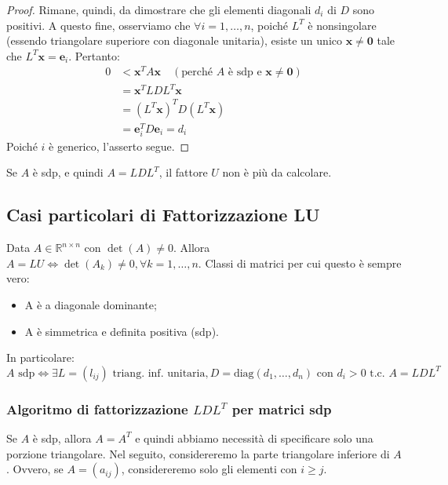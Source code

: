 \begin{proof}
Rimane, quindi, da dimostrare che gli elementi diagonali $d_i$ di $D$ sono positivi.
A questo fine, osserviamo che $\forall i=1, \dots, n$, poiché $L^T$ è nonsingolare (essendo triangolare superiore con diagonale unitaria), esiste un unico $\mathbf{x} \neq \mathbf{0}$ tale che $L^T \mathbf{x} = \mathbf{e}_i$.
Pertanto:
\begin{align*}
    0 &< \mathbf{x}^T A \mathbf{x} \quad (\text{perché } A \text{ è sdp e } \mathbf{x} \neq \mathbf{0}) \\
      &= \mathbf{x}^T L D L^T \mathbf{x} \\
      &= (L^T \mathbf{x})^T D (L^T \mathbf{x}) \\
      &= \mathbf{e}_i^T D \mathbf{e}_i = d_i
\end{align*}
Poiché $i$ è generico, l'asserto segue.
\end{proof}

\begin{osservazione}
Se $A$ è sdp, e quindi $A=LDL^T$, il fattore $U$ non è più da calcolare.
\end{osservazione}


\subsection{Casi particolari di Fattorizzazione LU}
Data $A \in \mathbb{R}^{n \times n}$ con $\det(A) \neq 0$.
Allora $A=LU \iff \det(A_k) \neq 0, \forall k=1, \dots, n$.
Classi di matrici per cui questo è sempre vero:
\begin{itemize}
    \item A è a diagonale dominante;
    \item A è simmetrica e definita positiva (sdp).
\end{itemize}
In particolare:
$$ A \text{ sdp} \iff \exists L=(l_{ij}) \text{ triang. inf. unitaria}, D=\text{diag}(d_1, \dots, d_n) \text{ con } d_i>0 \text{ t.c. } A = LDL^T $$

\subsubsection{Algoritmo di fattorizzazione $LDL^T$ per matrici sdp}
Se $A$ è sdp, allora $A=A^T$ e quindi abbiamo necessità di specificare solo una porzione triangolare. Nel seguito, considereremo la parte triangolare inferiore di $A$. Ovvero, se $A=(a_{ij})$, considereremo solo gli elementi con $i \ge j$.

